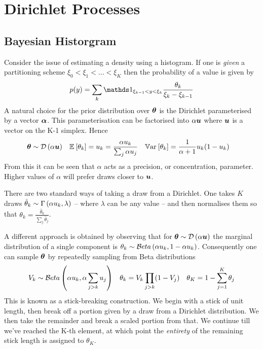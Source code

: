 

\section{Dirichlet Processes}

\subsection{Bayesian Historgram}
Consider the issue of estimating a density using a histogram. If one is \emph{given} a partitioning scheme $\xi_0 < \xi_1 < \ldots < \xi_K$ then the probability of a value is given by
\begin{align}
p(y) = \sum_k \one_{\xi_{k-1}<y<\xi_k} \frac{\theta_k}{\xi_k - \xi_{k-1}} \label{chap1:eqn:bayes-hist}
\end{align}
A natural choice for the prior distribution over $\bm \theta$ is the Dirichlet parameterised by a vector $\bm \alpha$. This parameterisation can be factorised into $\alpha \bm u$ where $\bm u$ is a vector on the K-1 simplex. Hence
\begin{align}
\bm \theta &\sim \mathcal{D} \left( {\alpha \bm u} \right) &
\mathbb{E}_{ {  } }\left[ \theta_k \right] & = u_k = \frac{\alpha u_k}{\sum_j \alpha u_j} &
\mathbb{V}\text{ar}_{ {  } }\left[ \theta_k \right] & = \frac{1}{ {\alpha + 1} } u_k (1 - u_k) \label{chap1:eqn:dir-variance-etc}
\end{align}
From this it can be seen that $\alpha$ acts as a precision, or concentration, parameter. Higher values of $\alpha$ will prefer draws closer to $\bm u$.

There are two standard ways of taking a draw from a Dirichlet. One takes $K$ draws $\hat{\theta}_k \sim \Gamma \left( {\alpha u_k}, {\lambda} \right)$ -- where $\lambda$ can be any value -- and then normalises them so that $\theta_k = \frac{\hat{\theta}_k}{\sum_j \hat{\theta}_j}$. 

A different approach is obtained by observing that for $\bm \theta \sim \mathcal{D} \left( {\alpha \bm u} \right)$ the marginal distribution of a single component is $\theta_k \sim \mathcal{B}eta \left( {\alpha u_k}, {1- \alpha u_k} \right)$. Consequently one can sample $\bm \theta$ by repeatedly sampling from Beta distributions
\begin{align}
V_k & \sim \mathcal{B}eta \left( {\alpha u_k}, {\alpha \sum_{j>k} u_j} \right) &
\theta_k & = V_k \prod_{j > k}(1 - V_j) &
\theta_K = 1 - \sum_{j=1}^{K} \theta_j
\end{align}
This is known as a stick-breaking construction. We begin with a stick of unit length, then break off a portion given by a draw from a Dirichlet distribution. We then take the remainder and break a scaled portion from that. We continue till we've reached the K-th element, at which point the \emph{entirety} of the remaining stick length is assigned to $\theta_K$.

